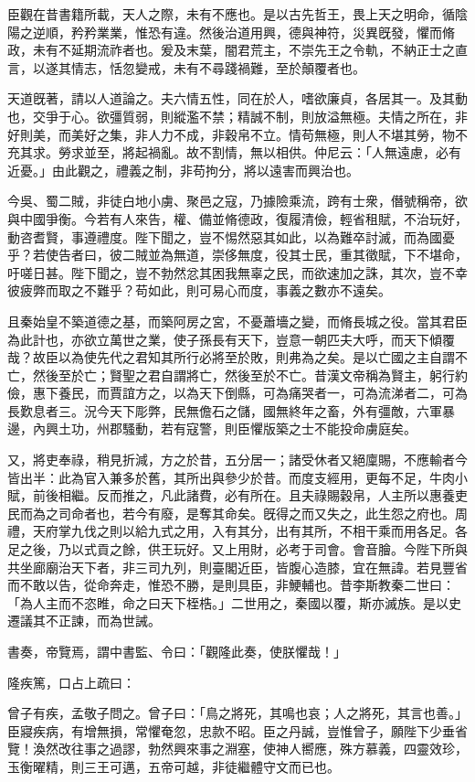 \begin{pinyinscope}
臣觀在昔書籍所載，天人之際，未有不應也。是以古先哲王，畏上天之明命，循陰陽之逆順，矜矜業業，惟恐有違。然後治道用興，德與神符，災異旣發，懼而脩政，未有不延期流祚者也。爰及末葉，闇君荒主，不崇先王之令軌，不納正士之直言，以遂其情志，恬忽變戒，未有不尋踐禍難，至於顛覆者也。

天道旣著，請以人道論之。夫六情五性，同在於人，嗜欲廉貞，各居其一。及其動也，交爭于心。欲彊質弱，則縱濫不禁；精誠不制，則放溢無極。夫情之所在，非好則美，而美好之集，非人力不成，非穀帛不立。情苟無極，則人不堪其勞，物不充其求。勞求並至，將起禍亂。故不割情，無以相供。仲尼云：「人無遠慮，必有近憂。」由此觀之，禮義之制，非苟拘分，將以遠害而興治也。

今吳、蜀二賊，非徒白地小虜、聚邑之寇，乃據險乘流，跨有士衆，僭號稱帝，欲與中國爭衡。今若有人來告，權、備並脩德政，復履清儉，輕省租賦，不治玩好，動咨耆賢，事遵禮度。陛下聞之，豈不惕然惡其如此，以為難卒討滅，而為國憂乎？若使告者曰，彼二賊並為無道，崇侈無度，役其士民，重其徵賦，下不堪命，吁嗟日甚。陛下聞之，豈不勃然忿其困我無辜之民，而欲速加之誅，其次，豈不幸彼疲弊而取之不難乎？苟如此，則可易心而度，事義之數亦不遠矣。

且秦始皇不築道德之基，而築阿房之宮，不憂蕭墻之變，而脩長城之役。當其君臣為此計也，亦欲立萬世之業，使子孫長有天下，豈意一朝匹夫大呼，而天下傾覆哉？故臣以為使先代之君知其所行必將至於敗，則弗為之矣。是以亡國之主自謂不亡，然後至於亡；賢聖之君自謂將亡，然後至於不亡。昔漢文帝稱為賢主，躬行約儉，惠下養民，而賈誼方之，以為天下倒縣，可為痛哭者一，可為流涕者二，可為長歎息者三。況今天下彫弊，民無儋石之儲，國無終年之畜，外有彊敵，六軍暴邊，內興土功，州郡騷動，若有寇警，則臣懼版築之士不能投命虜庭矣。

又，將吏奉祿，稍見折減，方之於昔，五分居一；諸受休者又絕廩賜，不應輸者今皆出半：此為官入兼多於舊，其所出與參少於昔。而度支經用，更每不足，牛肉小賦，前後相繼。反而推之，凡此諸費，必有所在。且夫祿賜穀帛，人主所以惠養吏民而為之司命者也，若今有廢，是奪其命矣。旣得之而又失之，此生怨之府也。周禮，天府掌九伐之則以給九式之用，入有其分，出有其所，不相干乘而用各足。各足之後，乃以式貢之餘，供王玩好。又上用財，必考于司會。會音膾。今陛下所與共坐廊廟治天下者，非三司九列，則臺閣近臣，皆腹心造膝，宜在無諱。若見豐省而不敢以告，從命奔走，惟恐不勝，是則具臣，非鯁輔也。昔李斯教秦二世曰：「為人主而不恣睢，命之曰天下桎梏。」二世用之，秦國以覆，斯亦滅族。是以史遷議其不正諫，而為世誡。

書奏，帝覽焉，謂中書監、令曰：「觀隆此奏，使朕懼哉！」

隆疾篤，口占上疏曰：

曾子有疾，孟敬子問之。曾子曰：「鳥之將死，其鳴也哀；人之將死，其言也善。」臣寢疾病，有增無損，常懼奄忽，忠款不昭。臣之丹誠，豈惟曾子，願陛下少垂省覽！渙然改往事之過謬，勃然興來事之淵塞，使神人嚮應，殊方慕義，四靈效珍，玉衡曜精，則三王可邁，五帝可越，非徒繼體守文而已也。


\end{pinyinscope}
